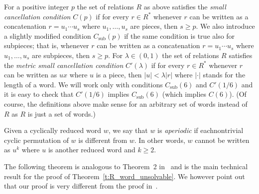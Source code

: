 \documentclass[10pt,a4paper]{article}
\theoremstyle{definition}
\theoremstyle{remark}
\DeclareMathOperator{\sub}{sub}
\begin{document}
For a positive integer $p$ the set of relations $R$ as above satisfies the \emph{small cancellation
condition} $C(p)$ if for every $r \in R^*$ whenever $r$ can be written as a
concatenation $r = u_1\cdots u_s$
where $u_1, \dots, u_s$ are pieces, then $s \geq p$. We also introduce a
slightly modified condition $C_{\sub}(p)$ if the same condition is true also
for subpieces; that is, whenever $r$ can be written as a
concatenation $r = u_1\cdots u_s$
where $u_1, \dots, u_s$ are subpieces, then $s \geq p$.
For $\lambda \in (0,1)$ the set of relations $R$ satisfies the 
\emph{metric small cancellation condition} $C'(\lambda)$ if for every $r \in
R^*$ whenever $r$ can be written as $ux$ where $u$ is a piece, then $|u| <
\lambda|r|$ where $|\cdot|$ stands for the length of a word. We will work only
with conditions $C_{\sub}(6)$ and $C'(1/6)$ and it is easy to check that $C'(1/6)$
implies $C_{\sub}(6)$ (which implies $C(6)$). (Of course, the definitions above make sense for an
arbitrary set of words instead of $R$ as $R$ is just a set of words.)

Given a cyclically reduced word $w$, we say that $w$ is \emph{aperiodic} if eachnontrivial cyclic permutation of $w$ is different from $w$. In other words, $w$ cannot be written as $u^k$ where $u$ is another reduced word and $k \geq 2$.



The following theorem is analogous to Theorem~2 in~\cite{borisov69} and is the
main technical result for the proof of Theorem~\ref{t:R_word_unsolvable}. We
however point out that our proof is very different from the proof
in~\cite{borisov69}. 
\end{document}
